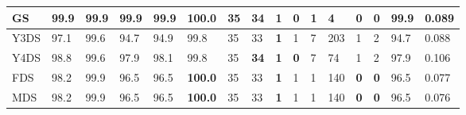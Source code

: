 \begin{table}[]
{\begin{tabular}{|l|l|l|l|l|l|l|l|l|l|l|l|l|l|l|l|}
			GS     & \textbf{99.9}                                        & 99.9                                                & \textbf{99.9}                                       & \textbf{99.9}                                          & \textbf{100.0}                                         & 35                                                   & \textbf{34} & \textbf{1}                                           & \textbf{0} & 1          & 4          & \textbf{0} & \textbf{0} & \textbf{99.9}                                        & 0.089          \\ \hline
			Y3DS   & 97.1                                                 & 99.6                                                & 94.7                                                & 94.9                                                   & 99.8                                                   & 35                                                   & 33          & \textbf{1}                                           & 1          & 7          & 203        & 1          & 2          & 94.7                                                 & 0.088          \\ \hline
			Y4DS   & 98.8                                                 & 99.6                                                & 97.9                                                & 98.1                                                   & 99.8                                                   & 35                                                   & \textbf{34} & \textbf{1}                                           & \textbf{0} & 7          & 74         & 1          & 2          & 97.9                                                 & 0.106          \\ \hline
			FDS    & 98.2                                                 & 99.9                                                & 96.5                                                & 96.5                                                   & \textbf{100.0}                                         & 35                                                   & 33          & \textbf{1}                                           & 1          & 1          & 140        & \textbf{0} & \textbf{0} & 96.5                                                 & 0.077          \\ \hline
			MDS    & 98.2                                                 & 99.9                                                & 96.5                                                & 96.5                                                   & \textbf{100.0}                                         & 35                                                   & 33          & \textbf{1}                                           & 1          & 1          & 140        & \textbf{0} & \textbf{0} & 96.5                                                 & 0.076          \\ \hline

\end{tabular}}
\end{table}
